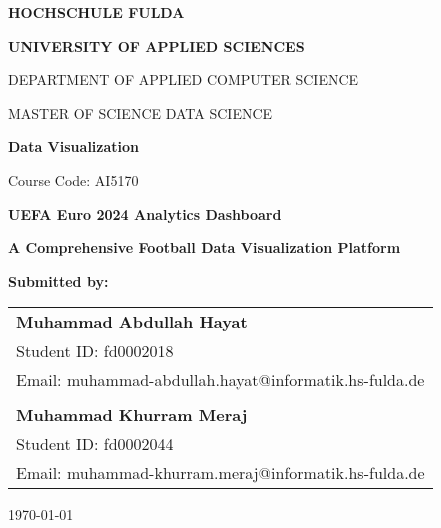 \documentclass[12pt,a4paper]{article}
\begin{document}
\begin{titlepage}
    \centering
    
    \vspace*{1cm}
    
    {\Large \textbf{HOCHSCHULE FULDA} \par}
    {\large \textbf{UNIVERSITY OF APPLIED SCIENCES} \par}
    \vspace{0.5cm}
    
    {\large DEPARTMENT OF APPLIED COMPUTER SCIENCE \par}
    {\large MASTER OF SCIENCE DATA SCIENCE \par}
    \vspace{2cm}
    
    {\Large \textbf{Data Visualization} \par}
    {\large Course Code: AI5170 \par}
    \vspace{2cm}
    
    {\Huge \textbf{UEFA Euro 2024 Analytics Dashboard} \par}
    \vspace{0.5cm}
    {\LARGE \textbf{A Comprehensive Football Data Visualization Platform} \par}
    \vspace{3cm}
    
    {\large \textbf{Submitted by:} \par}
    \vspace{0.5cm}
    
    \begin{tabular}{l}
        \textbf{Muhammad Abdullah Hayat} \\
        Student ID: fd0002018 \\
        Email: muhammad-abdullah.hayat@informatik.hs-fulda.de \\
        \\
        \textbf{Muhammad Khurram Meraj} \\
        Student ID: fd0002044 \\
        Email: muhammad-khurram.meraj@informatik.hs-fulda.de \\
    \end{tabular}
    
    \vfill
    
    {\large \today \par}
    
\end{titlepage}
\end{document}
